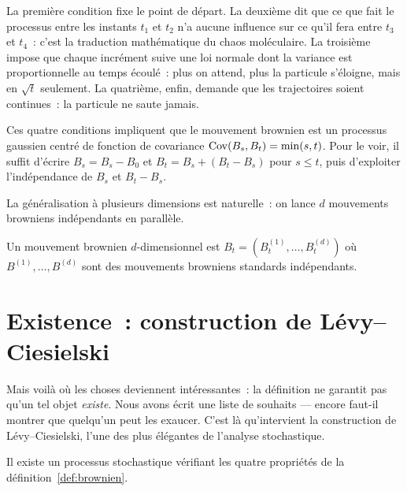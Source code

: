 La premi\`ere condition fixe le point de d\'epart. La deuxi\`eme dit que ce que
fait le processus entre les instants $t_1$ et $t_2$ n'a aucune influence sur
ce qu'il fera entre $t_3$ et $t_4$~: c'est la traduction math\'ematique du
chaos mol\'eculaire. La troisi\`eme impose que chaque incr\'ement suive une loi
normale dont la variance est proportionnelle au temps \'ecoul\'e~: plus on
attend, plus la particule s'\'eloigne, mais en $\sqrt{t}$ seulement. La
quatri\`eme, enfin, demande que les trajectoires soient continues~: la
particule ne \og saute\fg{} jamais.

\begin{remarque}
Ces quatre conditions impliquent que le mouvement brownien est un processus
gaussien centr\'e de fonction de covariance $\mathrm{Cov}(B_s, B_t) = \min(s, t)$.
Pour le voir, il suffit d'\'ecrire $B_s = B_s - B_0$ et
$B_t = B_s + (B_t - B_s)$ pour $s \leq t$, puis d'exploiter l'ind\'ependance
de $B_s$ et $B_t - B_s$.
\end{remarque}

La g\'en\'eralisation \`a plusieurs dimensions est naturelle~: on lance $d$
mouvements browniens ind\'ependants en parall\`ele.

\begin{definition}
Un mouvement brownien $d$-dimensionnel est $B_t = (B_t^{(1)}, \ldots, B_t^{(d)})$
o\`u $B^{(1)}, \ldots, B^{(d)}$ sont des mouvements browniens standards ind\'ependants.
\end{definition}

\section{Existence~: construction de L\'evy--Ciesielski}

Mais voil\`a o\`u les choses deviennent int\'eressantes~: la d\'efinition ne
garantit pas qu'un tel objet \emph{existe}. Nous avons \'ecrit une liste de
souhaits --- encore faut-il montrer que quelqu'un peut les exaucer. C'est
l\`a qu'intervient la construction de L\'evy--Ciesielski, l'une des plus
\'el\'egantes de l'analyse stochastique.

\begin{theoreme}
\label{thm:existence_brownien}
Il existe un processus stochastique v\'erifiant les quatre propri\'et\'es de la
d\'efinition~\ref{def:brownien}.
\end{theoreme}

